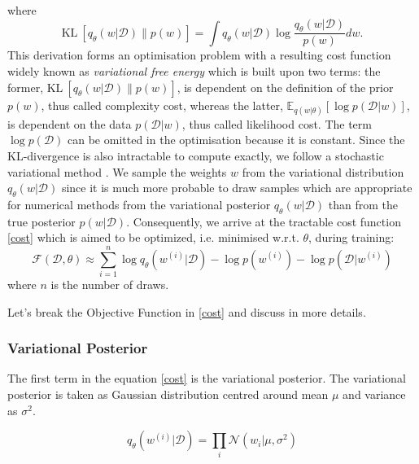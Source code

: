 where
\begin{equation}
    \text{KL} \ [q_{\theta}(w|\mathcal{D})\|p(w)]= \int q_{\theta}(w|\mathcal{D})\log\frac{q_{\theta}(w|\mathcal{D})}{p(w)}dw .
\end{equation}
This derivation forms an optimisation problem with a resulting cost function widely known as \textit{variational free energy} \cite{neal1998view,yedidia2005constructing,friston2007variational} which is built upon two terms: the former, $\text{KL} \ [q_{\theta}(w|\mathcal{D})\|p(w)]$, is dependent on the definition of the prior $p(w)$, thus called complexity cost, whereas the latter, $\mathbb{E}_{q(w|\theta)}[\log p(\mathcal{D}|w)]$, is dependent on the data $p(\mathcal{D}|w)$, thus called likelihood cost. 
The term $\log p(\mathcal{D})$ can be omitted in the optimisation because it is constant.
\newline Since the KL-divergence is also intractable to compute exactly, we follow a stochastic variational method \cite{graves2011practical,blundell2015weight}.
We sample the weights $w$ from the variational distribution $q_{\theta}(w|\mathcal{D})$ since it is much more probable to draw samples which are appropriate for numerical methods from the variational posterior $q_{\theta}(w|\mathcal{D})$ than from the true posterior $p(w|\mathcal{D})$. Consequently, we arrive at the tractable cost function \eqref{cost} which is aimed to be optimized, i.e. minimised w.r.t. $\theta$, during training:
\begin{equation} \label{cost}
    \mathcal{F}(\mathcal{D}, \theta)\approx \sum_{i=1}^n \log q_{\theta}(w^{(i)}|\mathcal{D})-\log p(w^{(i)})-\log p(\mathcal{D}|w^{(i)})
\end{equation}
%
where $n$ is the number of draws.

Let's break the Objective Function in \eqref{cost} and discuss in more details. 
\subsubsection{Variational Posterior }

The first term in the equation \eqref{cost} is the variational posterior. The variational posterior is taken as Gaussian distribution centred around mean $\mu$ and variance as $\sigma^2$. 

\begin{equation}
    q_{\theta}(w^{(i)}|\mathcal{D})= \prod_{i} \mathcal{N}(w_{i} | \mu,\sigma^2)
\end{equation}

